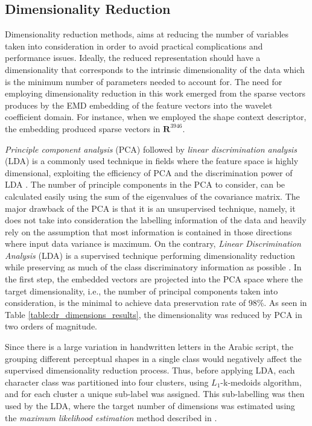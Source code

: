 \documentclass[10pt, conference, compsocconf]{IEEEtran}
\begin{document}
\subsection{Dimensionality Reduction}
\label{subsec:dimensionality_reduction}
Dimensionality reduction methods, aims at reducing the number of variables taken into consideration in order to avoid practical complications and performance issues. 
Ideally, the reduced representation should have a dimensionality that corresponds to the intrinsic dimensionality of the data \cite{van2009dimensionality} which is the minimum number of parameters needed to account for.
The need for employing dimensionality reduction in this work emerged from the sparse vectors produces by the EMD embedding of the feature vectors into the wavelet coefficient domain.
For instance, when we employed the shape context descriptor, the embedding produced sparse vectors in $\mathbf{R}^{3946}$. 

\emph{Principle component analysis} (PCA) followed by \emph{linear discrimination analysis} (LDA) is a commonly used technique in fields where the feature space is highly dimensional, exploiting the efficiency of PCA and the discrimination power of LDA \cite{yu2001direct,yang2003can}.
The number of principle components in the PCA to consider, can be calculated easily using the sum of the eigenvalues of the covariance matrix.
The major drawback of the PCA is that it is an unsupervised technique, namely, it does not take into consideration the labelling information of the data and heavily rely on the assumption that most information is contained in those directions where input data variance is maximum.
On the contrary, \emph{Linear Discrimination Analysis} (LDA) is a supervised technique performing dimensionality reduction while preserving as much of the class discriminatory information as possible \cite{fisher1936use}. 
In the first step, the embedded vectors are projected into the PCA space where the target dimensionality, i.e., the number of principal components taken into consideration, is the minimal to achieve data preservation rate of 98\%.
As seen in Table \ref{table:dr_dimensions_results}, the dimensionality was reduced by PCA in two orders of magnitude.

Since there is a large variation in handwritten letters in the Arabic script, the grouping different perceptual shapes in a single class would negatively affect the supervised dimensionality reduction process.
Thus, before applying LDA, each character class was partitioned into four clusters, using $L_1$-k-medoids algorithm, and for each cluster a unique sub-label was assigned. 
This sub-labelling was then used by the LDA, where the target number of dimensions was estimated using the \emph{maximum likelihood estimation} method described in \cite{levina2004maximum}.
\end{document}
